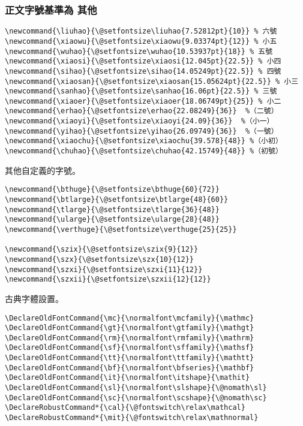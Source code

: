 \subsubsection{正文字號基準為 其他}

\begin{lstlisting}[firstnumber=177]
\newcommand{\liuhao}{\@setfontsize\liuhao{7.52812pt}{10}} % 六號
\newcommand{\xiaowu}{\@setfontsize\xiaowu{9.03374pt}{12}} % 小五
\newcommand{\wuhao}{\@setfontsize\wuhao{10.53937pt}{18}} % 五號
\newcommand{\xiaosi}{\@setfontsize\xiaosi{12.045pt}{22.5}} % 小四
\newcommand{\sihao}{\@setfontsize\sihao{14.05249pt}{22.5}} % 四號
\newcommand{\xiaosan}{\@setfontsize\xiaosan{15.05624pt}{22.5}} % 小三
\newcommand{\sanhao}{\@setfontsize\sanhao{16.06pt}{22.5}} % 三號
\newcommand{\xiaoer}{\@setfontsize\xiaoer{18.06749pt}{25}} % 小二
\newcommand{\erhao}{\@setfontsize\erhao{22.08249}{36}}  %（二號）
\newcommand{\xiaoyi}{\@setfontsize\xiaoyi{24.09}{36}}  %（小一）
\newcommand{\yihao}{\@setfontsize\yihao{26.09749}{36}}  %（一號）
\newcommand{\xiaochu}{\@setfontsize\xiaochu{39.578}{48}} %（小初）
\newcommand{\chuhao}{\@setfontsize\chuhao{42.15749}{48}} %（初號）
\end{lstlisting}

\par%
其他自定義的字號。
\begin{lstlisting}[firstnumber=192]
\newcommand{\bthuge}{\@setfontsize\bthuge{60}{72}}
\newcommand{\btlarge}{\@setfontsize\btlarge{48}{60}}
\newcommand{\tlarge}{\@setfontsize\tlarge{36}{48}}
\newcommand{\ularge}{\@setfontsize\ularge{28}{48}}
\newcommand{\verthuge}{\@setfontsize\verthuge{25}{25}}

\newcommand{\szix}{\@setfontsize\szix{9}{12}}
\newcommand{\szx}{\@setfontsize\szx{10}{12}}
\newcommand{\szxi}{\@setfontsize\szxi{11}{12}}
\newcommand{\szxii}{\@setfontsize\szxii{12}{12}}
\end{lstlisting}

\par%
古典字體設置。
\begin{lstlisting}[firstnumber=207]
\DeclareOldFontCommand{\mc}{\normalfont\mcfamily}{\mathmc}
\DeclareOldFontCommand{\gt}{\normalfont\gtfamily}{\mathgt}
\DeclareOldFontCommand{\rm}{\normalfont\rmfamily}{\mathrm}
\DeclareOldFontCommand{\sf}{\normalfont\sffamily}{\mathsf}
\DeclareOldFontCommand{\tt}{\normalfont\ttfamily}{\mathtt}
\DeclareOldFontCommand{\bf}{\normalfont\bfseries}{\mathbf}
\DeclareOldFontCommand{\it}{\normalfont\itshape}{\mathit}
\DeclareOldFontCommand{\sl}{\normalfont\slshape}{\@nomath\sl}
\DeclareOldFontCommand{\sc}{\normalfont\scshape}{\@nomath\sc}
\DeclareRobustCommand*{\cal}{\@fontswitch\relax\mathcal}
\DeclareRobustCommand*{\mit}{\@fontswitch\relax\mathnormal}
\end{lstlisting}


